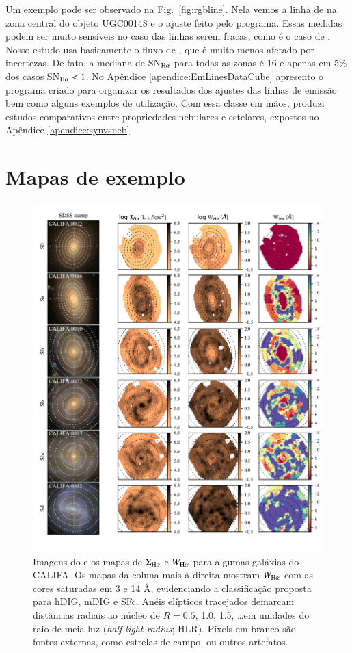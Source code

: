 Um exemplo pode ser observado na Fig.\ \ref{fig:rgbline}. Nela vemos a linha de \Hb na zona central do objeto UGC00148 e o ajuste feito pelo programa. Essas medidas podem ser muito sensíveis no caso das linhas serem fracas, como é o caso de \Hb. Nosso estudo usa basicamente o fluxo de \Ha, que é muito menos afetado por incertezas. De fato, a mediana de SN$_{\Ha}$ para todas as zonas é 16 e apenas em 5\% dos casos SN$_{\Ha} < 1$. No Apêndice \ref{apendice:EmLinesDataCube} apresento o programa criado para organizar os resultados dos ajustes das linhas de emissão bem como alguns exemplos de utilização. Com essa classe em mãos, produzi estudos comparativos entre propriedades nebulares e estelares, expostos no Apêndice \ref{apendice:synvsneb}


\section{Mapas de exemplo}
\label{sec:sample:maps}
\begin{figure}
\includegraphics[scale=0.9]{figuras/fig_maps_class_faceon_paper.pdf}
 \caption[Imagem \SDSS e mapas de $\Sigma_{{\rm H}\alpha}$ e $W_{{\rm H}\alpha}$]
 {Imagens do \SDSS e os mapas de $\Sigma_{\Ha}$ e $W_{\Ha}$ para algumas galáxias do CALIFA. Os mapas da coluna mais à direita mostram $W_{\Ha}$ com as cores saturadas em 3 e 14 \AA, evidenciando a classificação proposta para hDIG, mDIG e SFc. Anéis elípticos tracejados demarcam distâncias radiais ao núcleo de $R = 0.5$, 1.0, 1.5, \dots em unidades do raio de meia luz ({\em half-light radius}; HLR). Píxels em branco são fontes externas, como estrelas de campo, ou outros artefatos.}
 \label{fig:ExampleMaps}
\end{figure}

